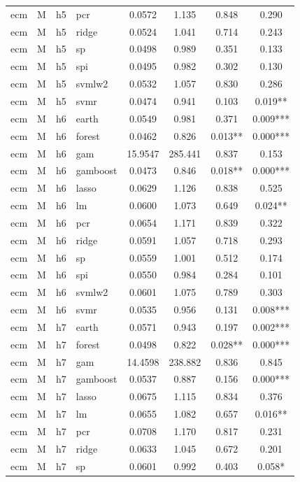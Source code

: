 \begin{ThreePartTable}
\begin{longtable}[t]{llclcccc}
ecm & M & h5 & pcr & 0.0572 & 1.135 & 0.848 & 0.290\\
ecm & M & h5 & ridge & 0.0524 & 1.041 & 0.714 & 0.243\\
ecm & M & h5 & sp & 0.0498 & 0.989 & 0.351 & 0.133\\
ecm & M & h5 & spi & 0.0495 & 0.982 & 0.302 & 0.130\\
ecm & M & h5 & svmlw2 & 0.0532 & 1.057 & 0.830 & 0.286\\
ecm & M & h5 & svmr & 0.0474 & 0.941 & 0.103 & 0.019**\\
\addlinespace
ecm & M & h6 & earth & 0.0549 & 0.981 & 0.371 & 0.009***\\
ecm & M & h6 & forest & 0.0462 & 0.826 & 0.013** & 0.000***\\
ecm & M & h6 & gam & 15.9547 & 285.441 & 0.837 & 0.153\\
ecm & M & h6 & gamboost & 0.0473 & 0.846 & 0.018** & 0.000***\\
ecm & M & h6 & lasso & 0.0629 & 1.126 & 0.838 & 0.525\\
ecm & M & h6 & lm & 0.0600 & 1.073 & 0.649 & 0.024**\\
ecm & M & h6 & pcr & 0.0654 & 1.171 & 0.839 & 0.322\\
ecm & M & h6 & ridge & 0.0591 & 1.057 & 0.718 & 0.293\\
ecm & M & h6 & sp & 0.0559 & 1.001 & 0.512 & 0.174\\
ecm & M & h6 & spi & 0.0550 & 0.984 & 0.284 & 0.101\\
ecm & M & h6 & svmlw2 & 0.0601 & 1.075 & 0.789 & 0.303\\
ecm & M & h6 & svmr & 0.0535 & 0.956 & 0.131 & 0.008***\\
\addlinespace
ecm & M & h7 & earth & 0.0571 & 0.943 & 0.197 & 0.002***\\
ecm & M & h7 & forest & 0.0498 & 0.822 & 0.028** & 0.000***\\
ecm & M & h7 & gam & 14.4598 & 238.882 & 0.836 & 0.845\\
ecm & M & h7 & gamboost & 0.0537 & 0.887 & 0.156 & 0.000***\\
ecm & M & h7 & lasso & 0.0675 & 1.115 & 0.834 & 0.376\\
ecm & M & h7 & lm & 0.0655 & 1.082 & 0.657 & 0.016**\\
ecm & M & h7 & pcr & 0.0708 & 1.170 & 0.817 & 0.231\\
ecm & M & h7 & ridge & 0.0633 & 1.045 & 0.672 & 0.201\\
ecm & M & h7 & sp & 0.0601 & 0.992 & 0.403 & 0.058*\\

\end{longtable}
\end{ThreePartTable}
